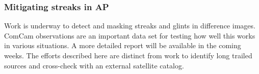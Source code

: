 \subsubsection{Mitigating streaks in AP}

Work is underway to detect and masking streaks and glints in difference images. ComCam observations are an important data set for testing how well this works in various situations. A more detailed report will be available in the coming weeks. The efforts described here are distinct from work to identify long trailed sources and cross-check with an external satellite catalog.
